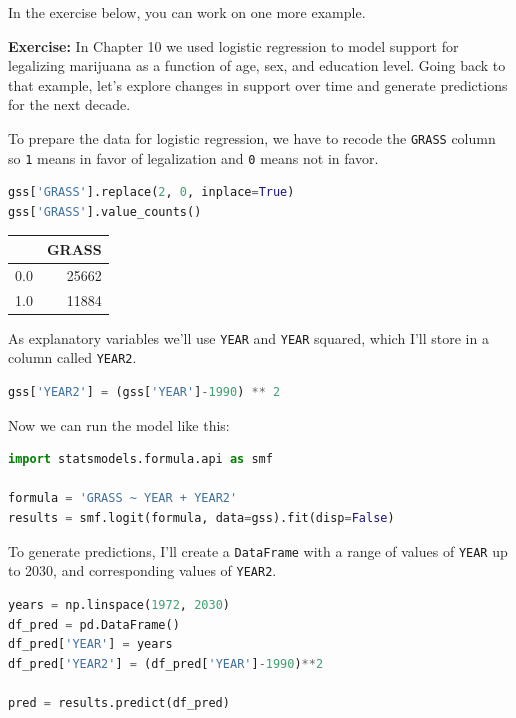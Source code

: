 In the exercise below, you can work on one more example.

\textbf{Exercise:} In Chapter 10 we used logistic regression to model
support for legalizing marijuana as a function of age, sex, and
education level. Going back to that example, let's explore changes in
support over time and generate predictions for the next decade.

To prepare the data for logistic regression, we have to recode the
\passthrough{\lstinline!GRASS!} column so \passthrough{\lstinline!1!}
means in favor of legalization and \passthrough{\lstinline!0!} means not
in favor.

\begin{lstlisting}[language=Python,style=source]
gss['GRASS'].replace(2, 0, inplace=True)
gss['GRASS'].value_counts()
\end{lstlisting}

\begin{tabular}{lr}
\toprule
{} &  GRASS \\
\midrule
0.0 &  25662 \\
1.0 &  11884 \\
\bottomrule
\end{tabular}

As explanatory variables we'll use \passthrough{\lstinline!YEAR!} and
\passthrough{\lstinline!YEAR!} squared, which I'll store in a column
called \passthrough{\lstinline!YEAR2!}.

\begin{lstlisting}[language=Python,style=source]
gss['YEAR2'] = (gss['YEAR']-1990) ** 2
\end{lstlisting}

Now we can run the model like this:

\begin{lstlisting}[language=Python,style=source]
import statsmodels.formula.api as smf

formula = 'GRASS ~ YEAR + YEAR2'
results = smf.logit(formula, data=gss).fit(disp=False)
\end{lstlisting}

To generate predictions, I'll create a
\passthrough{\lstinline!DataFrame!} with a range of values of
\passthrough{\lstinline!YEAR!} up to 2030, and corresponding values of
\passthrough{\lstinline!YEAR2!}.

\begin{lstlisting}[language=Python,style=source]
years = np.linspace(1972, 2030)
df_pred = pd.DataFrame()
df_pred['YEAR'] = years
df_pred['YEAR2'] = (df_pred['YEAR']-1990)**2

pred = results.predict(df_pred)
\end{lstlisting}

